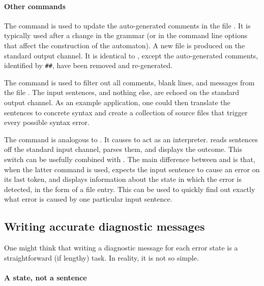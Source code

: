 \documentclass[onecolumn,11pt,nocopyrightspace,preprint]{sigplanconf}
\begin{document}
\paragraph{Other commands}

The command \oupdateerrors {} is used to update the auto-generated
comments in the \messages file . It is typically used after a
change in the grammar (or in the command line options that affect the
construction of the automaton). A new \messages file is produced on the
standard output channel. It is identical to , except the
auto-generated comments, identified by \verb+##+, have been removed and
re-generated.

The command \oechoerrors {} is used to filter out all comments,
blank lines, and messages from the \messages file . The input
sentences, and nothing else, are echoed on the standard output channel. As an
example application, one could then translate the sentences to concrete syntax
and create a collection of source files that trigger every possible syntax
error.

The command \ointerpreterror is analogous to \ointerpret. It causes \menhir to
act as an interpreter. \menhir reads sentences off the standard input channel,
parses them, and displays the outcome. This switch can be usefully combined
with \otrace. The main difference between \ointerpret and \ointerpreterror is
that, when the latter command is used,
\menhir expects the input sentence to cause an error on its last token, and
displays information about the state in which the error is detected, in the
form of a \messages file entry. This can be used to quickly find out exactly
what error is caused by one particular input sentence.


\subsection{Writing accurate diagnostic messages}
\label{sec:errors:diagnostics}

One might think that writing a diagnostic message for each error state is a
straightforward (if lengthy) task. In reality, it is not so simple.


\paragraph{A state, not a sentence}
\end{document}
